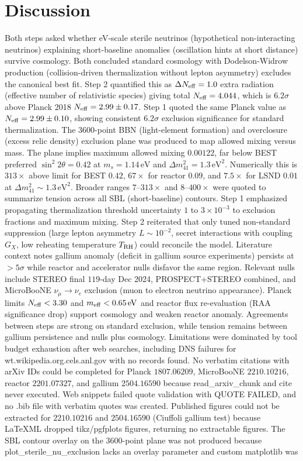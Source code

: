 \documentclass[11pt,a4paper]{article}
\begin{document}
\section{Discussion}
Both steps asked whether eV-scale sterile neutrinos (hypothetical non-interacting neutrinos) explaining short-baseline anomalies (oscillation hints at short distance) survive cosmology. Both concluded standard cosmology with Dodelson-Widrow production (collision-driven thermalization without lepton asymmetry) excludes the canonical best fit. Step 2 quantified this as $\Delta N_{\rm eff}=1.0$ extra radiation (effective number of relativistic species) giving total $N_{\rm eff}=4.044$, which is $6.2\sigma$ above Planck 2018 $N_{\rm eff}=2.99\pm0.17$. Step 1 quoted the same Planck value as $N_{\rm eff}=2.99\pm0.10$, showing consistent $6.2\sigma$ exclusion significance for standard thermalization. The $3600$-point BBN (light-element formation) and overclosure (excess relic density) exclusion plane was produced to map allowed mixing versus mass. The plane implies maximum allowed mixing $0.00122$, far below BEST preferred $\sin^2 2\theta=0.42$ at $m_s=1.14\,\mathrm{eV}$ and $\Delta m^2_{41}=1.3\,\mathrm{eV}^2$. Numerically this is $313\times$ above limit for BEST $0.42$, $67\times$ for reactor $0.09$, and $7.5\times$ for LSND $0.01$ at $\Delta m^2_{41}\sim1.3\,\mathrm{eV}^2$. Broader ranges $7$--$313\times$ and $8$--$400\times$ were quoted to summarize tension across all SBL (short-baseline) contours. Step 1 emphasized propagating thermalization threshold uncertainty $1$ to $3\times10^{-3}$ to exclusion fractions and maximum mixing. Step 2 reiterated that only tuned non-standard suppression (large lepton asymmetry $L\sim10^{-2}$, secret interactions with coupling $G_X$, low reheating temperature $T_{\rm RH}$) could reconcile the model. Literature context notes gallium anomaly (deficit in gallium source experiments) persists at $>5\sigma$ while reactor and accelerator nulls disfavor the same region. Relevant nulls include STEREO final $119$-day Dec 2024, PROSPECT+STEREO combined, and MicroBooNE $\nu_\mu\to\nu_e$ exclusion (muon to electron neutrino appearance). Planck limits $N_{\rm eff}<3.30$ and $m_{\rm eff}<0.65\,\mathrm{eV}$ and reactor flux re-evaluation (RAA significance drop) support cosmology and weaken reactor anomaly. Agreements between steps are strong on standard exclusion, while tension remains between gallium persistence and nulls plus cosmology. Limitations were dominated by tool budget exhaustion after web searches, including DNS failures for wt.wikipedia.org.cels.anl.gov with no records found. No verbatim citations with arXiv IDs could be completed for Planck $1807.06209$, MicroBooNE $2210.10216$, reactor $2201.07327$, and gallium $2504.16590$ because read\_arxiv\_chunk and cite never executed. Web snippets failed quote validation with QUOTE FAILED, and no .bib file with verbatim quotes was created. Published figures could not be extracted for $2210.10216$ and $2504.16590$ (Ciuffoli gallium test) because LaTeXML dropped tikz/pgfplots figures, returning no extractable figures. The SBL contour overlay on the $3600$-point plane was not produced because plot\_sterile\_nu\_exclusion lacks an overlay parameter and custom matplotlib was 
\end{document}
